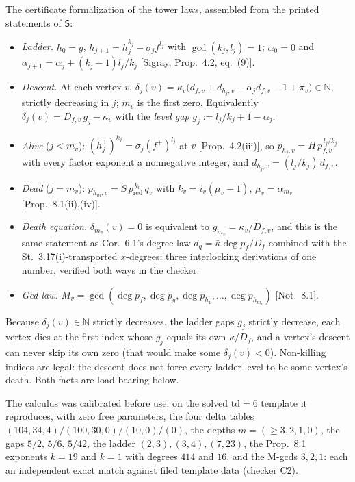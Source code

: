 \documentclass[11pt]{article}
\theoremstyle{definition}
\theoremstyle{remark}
\newcommand{\kb}{\bar\kappa}
\begin{document}
The certificate formalization of the tower laws, assembled from the printed statements of $\mathsf{S}$:
\begin{itemize}
\item \emph{Ladder.} $h_0=g$, $h_{j+1}=h_j^{k_j}-\sigma_j f^{l_j}$ with $\gcd(k_j,l_j)=1$; $\alpha_0=0$ and $\alpha_{j+1}=\alpha_j+(k_j-1)l_j/k_j$ [Sigray, Prop.~4.2, eq.~(9)].
\item \emph{Descent.} At each vertex $v$, $\delta_j(v)=\kappa_v\bigl(d_{f,v}+d_{h_j,v}-\alpha_j d_{f,v}-1+\pi_v\bigr)\in\mathbb{N}$, strictly decreasing in $j$; $m_v$ is the first zero. Equivalently $\delta_j(v)=D_{f,v}\,g_j-\kb_v$ with the \emph{level gap} $g_j:=l_j/k_j+1-\alpha_j$.
\item \emph{Alive} ($j<m_v$): $(h_j^{+})^{k_j}=\sigma_j(f^{+})^{l_j}$ at $v$ [Prop.~4.2(iii)], so $p_{h_j,v}=H\,p_{f,v}^{\,l_j/k_j}$ with every factor exponent a nonnegative integer, and $d_{h_j,v}=(l_j/k_j)\,d_{f,v}$.
\item \emph{Dead} ($j=m_v$): $p_{h_m,v}=S\,p_{\mathrm{red}}^{\,k_v}\,q_v$ with $k_v=i_v(\mu_v-1)$, $\mu_v=\alpha_{m_v}$ [Prop.~8.1(ii),(iv)].
\item \emph{Death equation.} $\delta_{m_v}(v)=0$ is equivalent to $g_{m_v}=\kb_v/D_{f,v}$, and this is the same statement as Cor.~6.1's degree law $d_q=\kb\deg p_f/D_f$ combined with the St.~3.17(i)-transported $x$-degrees: three interlocking derivations of one number, verified both ways in the checker.
\item \emph{Gcd law.} $M_v=\gcd(\deg p_f,\deg p_g,\deg p_{h_1},\dots,\deg p_{h_{m_v}})$ [Not.~8.1].
\end{itemize}
Because $\delta_j(v)\in\mathbb{N}$ strictly decreases, the ladder gaps $g_j$ strictly decrease, each vertex dies at the first index whose $g_j$ equals its own $\kb/D_f$, and a vertex's descent can never skip its own zero (that would make some $\delta_j(v)<0$). Non-killing indices are legal: the descent does not force every ladder level to be some vertex's death. Both facts are load-bearing below.

The calculus was calibrated before use: on the solved $\mathrm{td}=6$ template it reproduces, with zero free parameters, the four delta tables $(104,34,4)/(100,30,0)/(10,0)/(0)$, the depths $m=(\geq3,2,1,0)$, the gaps $5/2,\,5/6,\,5/42$, the ladder $(2,3),(3,4),(7,23)$, the Prop.~8.1 exponents $k=19$ and $k=1$ with degrees $414$ and $16$, and the M-gcds $3,2,1$: each an independent exact match against filed template data (checker C2).
\end{document}
